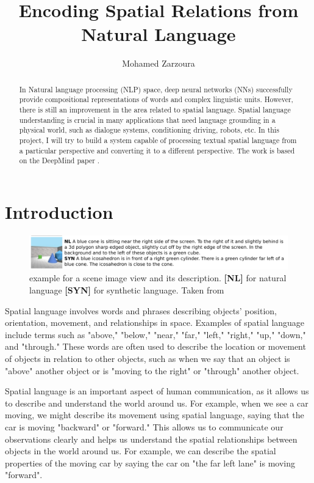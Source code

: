 \documentclass[11pt,a4paper]{article}
\title{Encoding Spatial Relations from Natural Language}
\author{Mohamed Zarzoura}
\date{}
\begin{document}
\maketitle

\begin{abstract}

 In Natural language processing (NLP) space, deep neural networks (NNs) successfully provide compositional representations of words and complex linguistic units. However, there is still an improvement in the area related to spatial language. Spatial language understanding is crucial in many applications
 that need language grounding in a physical world, such as dialogue systems, conditioning driving, robots, etc. In this project,  I will try to build a system capable of processing textual spatial language from a particular perspective and converting it to a different perspective. The work is based on the DeepMind paper \cite{ramalho2018encoding}.
\end{abstract}

\section{Introduction}

\begin{figure}[t]
    \centering
    \includegraphics[width=\textwidth]{SLIMExample.png}
    \caption{example for a scene image view and its description. \textbf{[NL]} for natural language \textbf{[SYN]} for synthetic language. Taken from \cite{ramalho2018encoding}}
    \label{fig:SLIMDATA}
\end{figure}

Spatial language involves words and phrases describing objects' position, orientation, movement, and relationships in space. Examples of spatial language include terms such as "above," "below," "near," "far," "left," "right," "up," "down," and "through." These words are often used to describe the location or movement of objects in relation to other objects, such as when we say that an object is "above" another object or is "moving to the right" or "through" another object.

Spatial language is an important aspect of human communication, as it allows us to describe and understand the world around us. For example, when we see a car moving, we might describe its movement using spatial language, saying that the car is moving "backward" or "forward." This allows us to communicate our observations clearly and helps us understand the spatial relationships between objects in the world around us. For example, we can describe the spatial properties of the moving car by saying the car on "the far left lane" is moving "forward".
\end{document}
